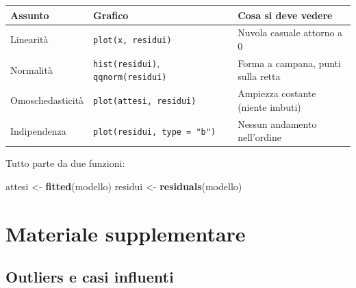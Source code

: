 \documentclass[
  a4paper,
  DIV=11,
  numbers=noendperiod]{scrreprt}
\newenvironment{Shaded}{\begin{snugshade}}{\end{snugshade}}
\newcommand{\FunctionTok}[1]{\textcolor[rgb]{0.13,0.29,0.53}{\textbf{#1}}}
\newcommand{\NormalTok}[1]{#1}
\newcommand{\OtherTok}[1]{\textcolor[rgb]{0.56,0.35,0.01}{#1}}
\begin{document}
\begin{longtable}[]{@{}
  >{\raggedright\arraybackslash}p{}
  >{\raggedright\arraybackslash}p{}
  >{\raggedright\arraybackslash}p{}@{}}
\toprule\noalign{}
\begin{minipage}[b]{\linewidth}\raggedright
Assunto
\end{minipage} & \begin{minipage}[b]{\linewidth}\raggedright
Grafico
\end{minipage} & \begin{minipage}[b]{\linewidth}\raggedright
Cosa si deve vedere
\end{minipage} \\
\midrule\noalign{}
\endhead
\bottomrule\noalign{}
\endlastfoot
Linearità & \texttt{plot(x,\ residui)} & Nuvola casuale attorno a 0 \\
Normalità & \texttt{hist(residui)}, \texttt{qqnorm(residui)} & Forma a
campana, punti sulla retta \\
Omoschedasticità & \texttt{plot(attesi,\ residui)} & Ampiezza costante
(niente imbuti) \\
Indipendenza & \texttt{plot(residui,\ type\ =\ "b")} & Nessun andamento
nell'ordine \\
\end{longtable}

\vspace{3mm}

Tutto parte da due funzioni:

\begin{Shaded}
\begin{Highlighting}[]
\NormalTok{attesi }\OtherTok{\textless{}{-}} \FunctionTok{fitted}\NormalTok{(modello)}
\NormalTok{residui }\OtherTok{\textless{}{-}} \FunctionTok{residuals}\NormalTok{(modello)}
\end{Highlighting}
\end{Shaded}

\section{Materiale supplementare}\label{materiale-supplementare}

\subsection{Outliers e casi influenti}\label{outliers-e-casi-influenti}
\end{document}
